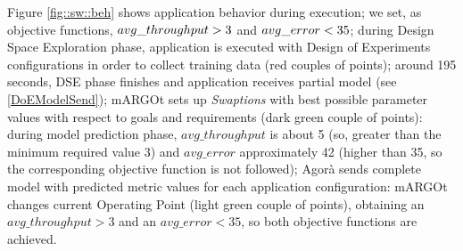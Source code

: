 Figure \ref{fig::sw::beh} shows application behavior during execution; we set, as objective functions, $avg\_\-throughput > 3$ and $avg\_\-error < 35$; during Design Space Exploration phase, application is executed with Design of Experiments configurations in order to collect training data (red couples of points); around 195 seconds, DSE phase finishes and application receives partial model (see \ref{DoEModelSend}); mARGOt sets up \textit{Swaptions} with best possible parameter values with respect to goals and requirements (dark green couple of points): during model prediction phase, $avg\_throughput$ is about 5 (so, great\-er than the minimum required value 3) and $avg\_error$ approximately 42 (higher than 35, so the corresponding objective function is not followed); Agorà sends complete model with predicted metric values for each application configuration: mARGOt changes current Operating Point (light green couple of points), obtaining an $avg\_throughput > 3$ and an $avg\_error < 35$, so both objective functions are achieved. 
